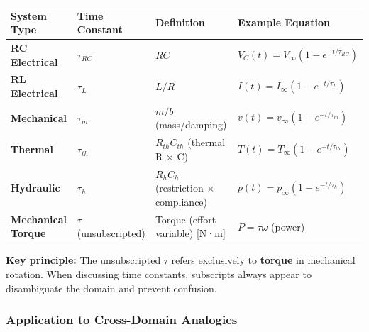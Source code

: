 \documentclass[
]{article}
\begin{document}
\begin{longtable}[]{@{}
  >{\raggedright\arraybackslash}p{}
  >{\raggedright\arraybackslash}p{}
  >{\raggedright\arraybackslash}p{}
  >{\raggedright\arraybackslash}p{}@{}}
\toprule\noalign{}
\begin{minipage}[b]{\linewidth}\raggedright
System Type
\end{minipage} & \begin{minipage}[b]{\linewidth}\raggedright
Time Constant
\end{minipage} & \begin{minipage}[b]{\linewidth}\raggedright
Definition
\end{minipage} & \begin{minipage}[b]{\linewidth}\raggedright
Example Equation
\end{minipage} \\
\midrule\noalign{}
\endhead
\bottomrule\noalign{}
\endlastfoot
\textbf{RC Electrical} & \(\tau_{RC}\) & \(RC\) &
\(V_C(t) = V_{\infty}(1 - e^{-t/\tau_{RC}})\) \\
\textbf{RL Electrical} & \(\tau_L\) & \(L/R\) &
\(I(t) = I_{\infty}(1 - e^{-t/\tau_L})\) \\
\textbf{Mechanical} & \(\tau_m\) & \(m/b\) (mass/damping) &
\(v(t) = v_{\infty}(1 - e^{-t/\tau_m})\) \\
\textbf{Thermal} & \(\tau_{th}\) & \(R_{th} C_{th}\) (thermal R × C) &
\(T(t) = T_{\infty}(1 - e^{-t/\tau_{th}})\) \\
\textbf{Hydraulic} & \(\tau_h\) & \(R_h C_h\) (restriction × compliance)
& \(p(t) = p_{\infty}(1 - e^{-t/\tau_h})\) \\
\textbf{Mechanical Torque} & \(\tau\) (unsubscripted) & Torque (effort
variable) {[}N·m{]} & \(P = \tau \omega\) (power) \\
\end{longtable}

\textbf{Key principle:} The unsubscripted \(\tau\) refers exclusively to
\textbf{torque} in mechanical rotation. When discussing time constants,
subscripts always appear to disambiguate the domain and prevent
confusion.

\subsubsection{Application to Cross-Domain
Analogies}\label{application-to-cross-domain-analogies}
\end{document}
